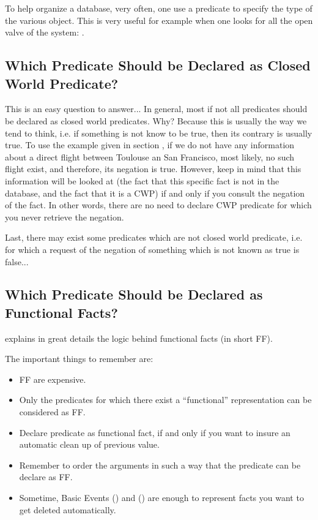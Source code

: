To help organize a database, very often, one use a  predicate
to specify the type of the various object. This is very useful for
example when one looks for all the open valve of the system: \*
.

\subsection{Which Predicate Should be Declared as Closed World Predicate?}

This is an easy question to answer... In general, most if not all
predicates should be declared as closed world predicates. Why? Because
this is usually the way we tend to think, i.e. if something is not know
to be true, then its contrary is usually true. To use the example given
in section , if we do not have any
information about a direct flight between Toulouse an San Francisco, most
likely, no such flight exist, and therefore, its negation is true.
However, keep in mind that this information will be looked at (the fact
that this specific fact is not in the database, and the fact that it is a
CWP) if and only if you consult the negation of the fact. In other words,
there are no need to declare CWP predicate for which you never retrieve
the negation.

Last, there may exist some predicates which are not closed world
predicate, i.e.
for which a request of the negation of something which is not known as
true is false...

\subsection{Which Predicate Should be Declared as Functional Facts?}

 explains in great details the logic
behind functional facts (in short FF).

The important things to remember are:

\begin{itemize}

\item FF are expensive.

\item Only the predicates for which there exist a ``functional''
representation can be considered as FF.

\item Declare predicate as functional fact, if and only if you want to
insure an automatic clean up of previous value.

\item Remember to order the arguments in such a way that the predicate can
be declare as FF.

\item Sometime, Basic Events () and () are enough to represent facts you want to get deleted
automatically.

\end{itemize}

